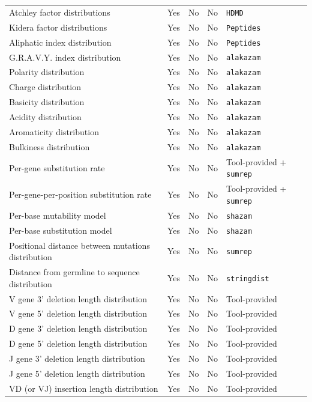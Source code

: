 \documentclass{article}
\begin{document}
\begin{table}
{\begin{tabular}{l|c|c|c|l}
    Atchley factor distributions & Yes & No & No & \texttt{HDMD} \cite{McFerrin13-ng} \\
    Kidera factor distributions & Yes & No & No & \texttt{Peptides} \cite{McFerrin13-ng} \\
Aliphatic index distribution & Yes & No & No & \texttt{Peptides} \\
    G.R.A.V.Y. index distribution & Yes & No & No & \texttt{alakazam} \cite{Gupta2015-iu} \\
    Polarity distribution & Yes & No & No & \texttt{alakazam} \\
    Charge distribution & Yes & No & No & \texttt{alakazam} \\
    Basicity distribution & Yes & No & No & \texttt{alakazam} \\
    Acidity distribution & Yes & No & No & \texttt{alakazam} \\
    Aromaticity distribution & Yes & No & No & \texttt{alakazam} \\
    Bulkiness distribution & Yes & No & No & \texttt{alakazam} \\
Per-gene substitution rate & Yes & No & No & Tool-provided + \texttt{sumrep} \\
Per-gene-per-position substitution rate & Yes & No & No & Tool-provided + \texttt{sumrep} \\
Per-base mutability model & Yes & No & No & \texttt{shazam} \cite{Gupta2015-iu} \\
Per-base substitution model & Yes & No & No & \texttt{shazam} \\
Positional distance between mutations distribution & Yes & No & No & \texttt{sumrep}  \\
Distance from germline to sequence distribution & Yes & No & No & \texttt{stringdist} \\
V gene 3' deletion length distribution & Yes & No & No & Tool-provided \\
V gene 5' deletion length distribution & Yes & No & No & Tool-provided \\
D gene 3' deletion length distribution & Yes & No & No & Tool-provided \\
D gene 5' deletion length distribution & Yes & No & No & Tool-provided \\
J gene 3' deletion length distribution & Yes & No & No & Tool-provided \\
J gene 5' deletion length distribution & Yes & No & No & Tool-provided \\
VD (or VJ) insertion length distribution & Yes & No & No & Tool-provided \\

\end{tabular}}
\end{table}
\end{document}
